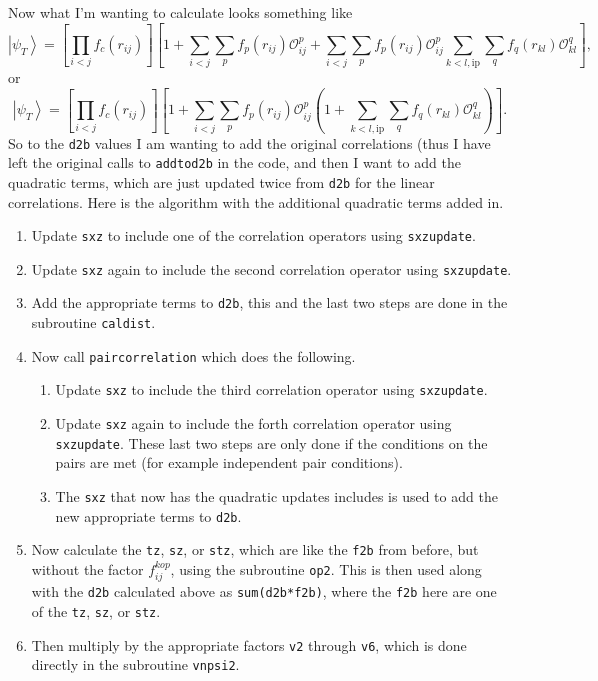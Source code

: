 \documentclass[12pt]{article}
\newcommand{\red}[1]{{\color{red}{#1}}}
\newcommand{\ket}[1]{\left| #1 \right>}
\newcommand{\fpij}{f_p(r_{ij})}
\newcommand{\Opij}{\mathcal{O}_{ij}^p}
\newcommand{\fOpij}{\sum\limits_{i<j}\sum\limits_p \fpij\Opij}
\newcommand{\fqkl}{f_q(r_{kl})}
\newcommand{\Oqkl}{\mathcal{O}_{kl}^q}
\newcommand{\fOqklip}{\sum\limits_{k<l,\mathrm{ip}}\sum\limits_q \fqkl\Oqkl}
\newcommand{\f}[2]{f_{#1}(r_{#2})}
\begin{document}
Now what I'm wanting to calculate looks something like
\begin{equation}
   \ket{\psi_T} = \left[\prod\limits_{i<j}\f{c}{ij}\right]\left[1+\fOpij+\fOpij\fOqklip \right],
\end{equation}
or
\begin{equation}
   \ket{\psi_T} = \left[\prod\limits_{i<j}\f{c}{ij}\right]\left[1+\fOpij\left(1+\fOqklip\right) \right].
\end{equation}
So to the \texttt{d2b} values I am wanting to add the original correlations (thus I have left the original calls to \texttt{addtod2b} in the code, and then I want to add the quadratic terms, which are just updated twice from \texttt{d2b} for the linear correlations. Here is the algorithm with the additional quadratic terms added in.
\begin{enumerate}
   \item Update \texttt{sxz} to include one of the correlation operators using \texttt{sxzupdate}.
   \item Update \texttt{sxz} again to include the second correlation operator using \texttt{sxzupdate}.
   \item Add the appropriate terms to \texttt{d2b}, this and the last two steps are done in the subroutine \texttt{caldist}.
   \item \red{Added step:} Now call \texttt{paircorrelation} which does the following.
   \begin{enumerate}
      \item Update \texttt{sxz} to include the third correlation operator using \texttt{sxzupdate}.
      \item Update \texttt{sxz} again to include the forth correlation operator using \texttt{sxzupdate}. These last two steps are only done if the conditions on the pairs are met (for example independent pair conditions).
      \item The \texttt{sxz} that now has the quadratic updates includes is used to add the new appropriate terms to \texttt{d2b}.
   \end{enumerate}
   \item Now calculate the \texttt{tz}, \texttt{sz}, or \texttt{stz}, which are like the \texttt{f2b} from before, but without the factor $f^{kop}_{ij}$, using the subroutine \texttt{op2}. This is then used along with the \texttt{d2b} calculated above as \texttt{sum(d2b*f2b)}, where the \texttt{f2b} here are one of the \texttt{tz}, \texttt{sz}, or \texttt{stz}.
   \item Then multiply by the appropriate factors \texttt{v2} through \texttt{v6}, which is done directly in the subroutine \texttt{vnpsi2}.
\end{enumerate}
\end{document}
